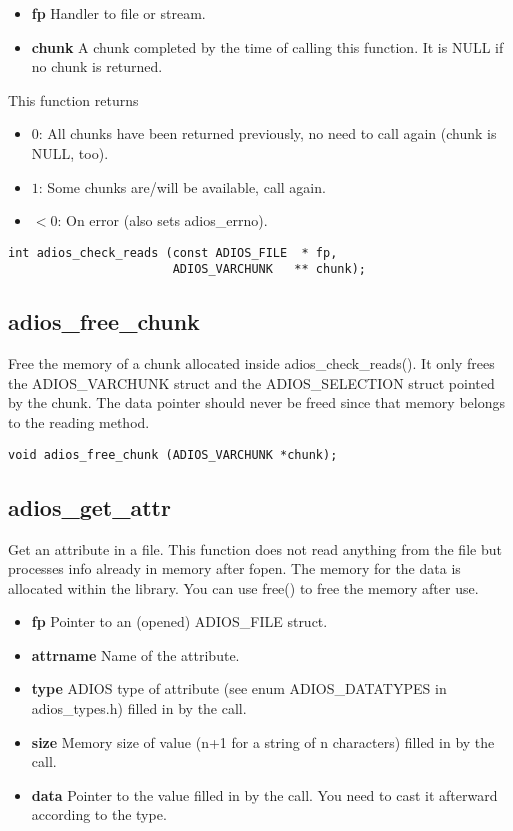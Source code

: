 \begin{itemize}
\item{\bf fp} Handler to file or stream.
\item{\bf chunk} A chunk completed by the time of calling this function.
It is NULL if no chunk is returned.
\end{itemize}
This function returns 
\begin{itemize}
\item $0$: All chunks have been returned previously, 
                no need to call again (chunk is NULL, too).
\item $1$: Some chunks are/will be available, call again. 
\item $<0$: On error (also sets adios\_errno).
\end{itemize}

\begin{lstlisting}[alsolanguage=C]
int adios_check_reads (const ADIOS_FILE  * fp, 
                       ADIOS_VARCHUNK   ** chunk);
\end{lstlisting}

\subsection{adios\_free\_chunk}
Free the memory of a chunk allocated inside adios\_check\_reads().
It only frees the ADIOS\_VARCHUNK struct and the ADIOS\_SELECTION struct
pointed by the chunk. The data pointer should never be freed since
that memory belongs to the reading method.

\begin{lstlisting}[alsolanguage=C]
void adios_free_chunk (ADIOS_VARCHUNK *chunk);
\end{lstlisting}



\subsection{adios\_get\_attr}
Get an attribute in a file.
This function does not read anything from the file but processes info
already in memory after fopen.
The memory for the data is allocated within the library.
You can use free() to free the memory after use.

\begin{itemize}
\item{\bf fp}       Pointer to an (opened) ADIOS\_FILE struct.
\item{\bf attrname} Name of the attribute.
\item{\bf type}    ADIOS type of attribute (see enum ADIOS\_DATATYPES in adios\_types.h) filled in by the call. 
\item{\bf size}     Memory size of value (n+1 for a string of n characters) filled in by the call. 
\item{\bf data}    Pointer to the value filled in by the call. You need to cast it afterward according to the type.
\end{itemize}

